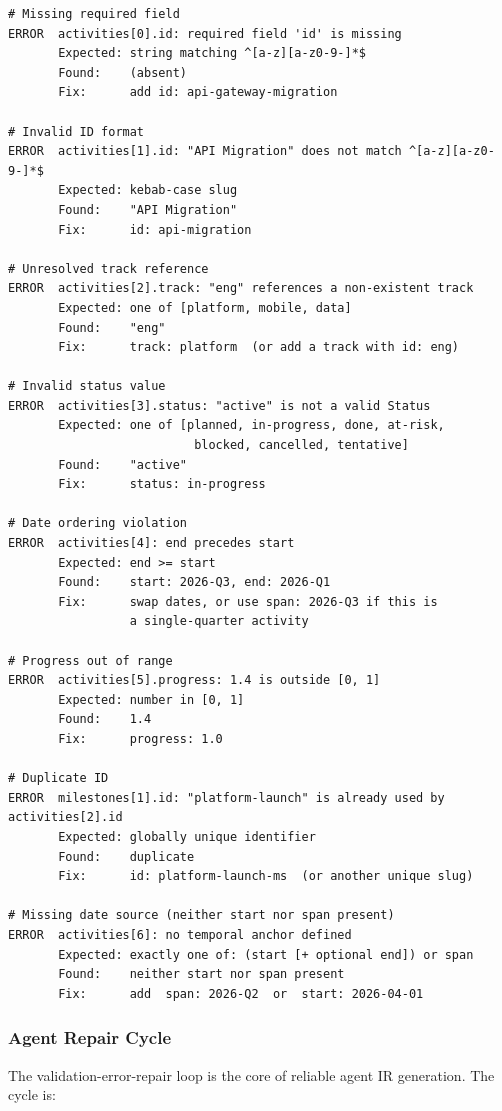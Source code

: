 \begin{lstlisting}[caption={Example validation errors with suggested fixes}]
# Missing required field
ERROR  activities[0].id: required field 'id' is missing
       Expected: string matching ^[a-z][a-z0-9-]*$
       Found:    (absent)
       Fix:      add id: api-gateway-migration

# Invalid ID format
ERROR  activities[1].id: "API Migration" does not match ^[a-z][a-z0-9-]*$
       Expected: kebab-case slug
       Found:    "API Migration"
       Fix:      id: api-migration

# Unresolved track reference
ERROR  activities[2].track: "eng" references a non-existent track
       Expected: one of [platform, mobile, data]
       Found:    "eng"
       Fix:      track: platform  (or add a track with id: eng)

# Invalid status value
ERROR  activities[3].status: "active" is not a valid Status
       Expected: one of [planned, in-progress, done, at-risk,
                          blocked, cancelled, tentative]
       Found:    "active"
       Fix:      status: in-progress

# Date ordering violation
ERROR  activities[4]: end precedes start
       Expected: end >= start
       Found:    start: 2026-Q3, end: 2026-Q1
       Fix:      swap dates, or use span: 2026-Q3 if this is
                 a single-quarter activity

# Progress out of range
ERROR  activities[5].progress: 1.4 is outside [0, 1]
       Expected: number in [0, 1]
       Found:    1.4
       Fix:      progress: 1.0

# Duplicate ID
ERROR  milestones[1].id: "platform-launch" is already used by activities[2].id
       Expected: globally unique identifier
       Found:    duplicate
       Fix:      id: platform-launch-ms  (or another unique slug)

# Missing date source (neither start nor span present)
ERROR  activities[6]: no temporal anchor defined
       Expected: exactly one of: (start [+ optional end]) or span
       Found:    neither start nor span present
       Fix:      add  span: 2026-Q2  or  start: 2026-04-01
\end{lstlisting}

\subsubsection{Agent Repair Cycle}
\label{sec:repair-cycle}

The validation-error-repair loop is the core of reliable agent IR generation. The
cycle is:

